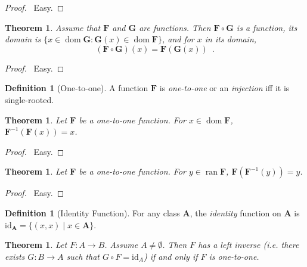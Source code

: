 \documentclass{article}
\let\qed\relax
\newtheorem{theorem}[axiom]{Theorem}
\theoremstyle{definition}
\newtheorem{definition}[axiom]{Definition}
\newcommand{\dom}{\ensuremath{\operatorname{dom}}}
\newcommand{\inv}[1]{\ensuremath{{#1}^{-1}}}
\newcommand{\ran}{\ensuremath{\operatorname{ran}}}
\begin{document}
    \begin{proof}
        \pf\ Easy. \qed
    \end{proof}

    \begin{theorem}
        Assume that $\mathbf{F}$ and $\mathbf{G}$ are functions. Then $\mathbf{F} \circ \mathbf{G}$
        is a function, its domain is $\{ x \in \dom \mathbf{G} : \mathbf{G}(x) \in \dom \mathbf{F} \}$,
        and for $x$ in its domain,
        \[ (\mathbf{F} \circ \mathbf{G})(x) = \mathbf{F}(\mathbf{G}(x)) \enspace . \]
    \end{theorem}

    \begin{proof}
        \pf\ Easy. \qed
    \end{proof}

    \begin{definition}[One-to-one]
        A function $\mathbf{F}$ is \emph{one-to-one} or an \emph{injection} iff it is single-rooted.
    \end{definition}

    \begin{theorem}
        Let $\mathbf{F}$ be a one-to-one function. For $x \in \dom \mathbf{F}$, $\inv{\mathbf{F}}(\mathbf{F}(x)) = x$.
    \end{theorem}

    \begin{proof}
        \pf\ Easy. \qed
    \end{proof}

    \begin{theorem}
        Let $\mathbf{F}$ be a one-to-one function. For $y \in \ran \mathbf{F}$, $\mathbf{F}(\inv{\mathbf{F}}(y)) = y$.
    \end{theorem}

    \begin{proof}
        \pf\ Easy. \qed
    \end{proof}

    \begin{definition}[Identity Function]
        For any class $\mathbf{A}$, the \emph{identity} function on $\mathbf{A}$ is $\mathrm{id}_\mathbf{A} =
        \{ (x,x) \mid x \in \mathbf{A} \}$.
    \end{definition}

    \begin{theorem}
        Let $F : A \rightarrow B$. Assume $A \neq \emptyset$. Then $F$ has a left inverse (i.e. there exists
        $G : B \rightarrow A$ such that $G \circ F = \mathrm{id}_A$) if and only if $F$ is one-to-one.
    \end{theorem}
\end{document}
